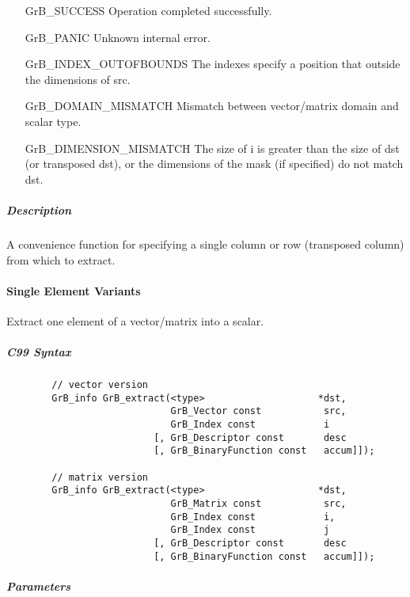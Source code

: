 \begin{itemize}[leftmargin=2.1in]
\item[{\sf GrB\_SUCCESS}]             Operation completed successfully.
\item[{\sf GrB\_PANIC}]               Unknown internal error.
\item[{\sf GrB\_INDEX\_OUTOFBOUNDS}]  The indexes specify a position that outside the dimensions of src.
\item[{\sf GrB\_DOMAIN\_MISMATCH}]    Mismatch between vector/matrix domain and scalar type.
\item[{\sf GrB\_DIMENSION\_MISMATCH}] 
       The size of {\sf i} is greater than the size of {\sf dst} (or transposed {\sf dst}), 
       or the dimensions of the mask (if specified) do not match dst.
\end{itemize}

\subparagraph{Description}

A convenience function for specifying a single column or row (transposed column) from which to extract.

\paragraph{Single Element Variants}

Extract one element of a vector/matrix into a scalar. 

\subparagraph{C99 Syntax}

\begin{verbatim}
        // vector version
        GrB_info GrB_extract(<type>                    *dst,
                             GrB_Vector const           src,
                             GrB_Index const            i
                          [, GrB_Descriptor const       desc 
                          [, GrB_BinaryFunction const   accum]]);

        // matrix version
        GrB_info GrB_extract(<type>                    *dst,
                             GrB_Matrix const           src,
                             GrB_Index const            i,
                             GrB_Index const            j
                          [, GrB_Descriptor const       desc 
                          [, GrB_BinaryFunction const   accum]]);

\end{verbatim}

\subparagraph{Parameters}

